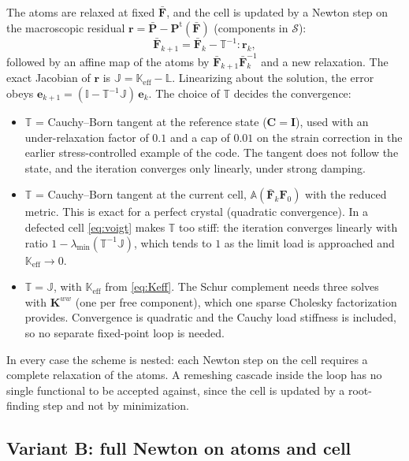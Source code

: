 \documentclass[11pt,a4paper]{article}
\newcommand{\Fb}{\bar{\mathbf F}}
\newcommand{\Pb}{\bar{\mathbf P}}
\newcommand{\Pt}{\mathbf P^{\mathrm t}}
\newcommand{\F}{\mathbf F}
\newcommand{\C}{\mathbf C}
\newcommand{\I}{\mathbf I}
\begin{document}
The atoms are relaxed at fixed \(\Fb\), and the cell is updated by a Newton step on the macroscopic
residual \(\mathbf r=\Pb-\Pt(\Fb)\) (components in \(\mathcal S\)):
\begin{equation}
  \Fb_{k+1}=\Fb_k-\mathbb T^{-1}:\mathbf r_k ,
  \label{eq:boxnewton}
\end{equation}
followed by an affine map of the atoms by \(\Fb_{k+1}\Fb_k^{-1}\) and a new relaxation. The exact
Jacobian of \(\mathbf r\) is \(\mathbb J=\mathbb K_{\mathrm{eff}}-\mathbb L\). Linearizing about the
solution, the error obeys \(\mathbf e_{k+1}=(\mathbb I-\mathbb T^{-1}\mathbb J)\,\mathbf e_k\). The choice of
\(\mathbb T\) decides the convergence:
\begin{itemize}
  \item \(\mathbb T\) = Cauchy--Born tangent at the reference state (\(\C=\I\)), used with an
    under-relaxation factor of \(0.1\) and a cap of \(0.01\) on the strain correction in the earlier
    stress-controlled example of the code. The tangent does not follow the state, and the
    iteration converges only linearly, under strong damping.
  \item \(\mathbb T\) = Cauchy--Born tangent at the current cell,
    \(\mathbb A(\Fb_k\F_0)\) with the reduced metric. This is exact for a perfect crystal
    (quadratic convergence). In a defected cell \eqref{eq:voigt} makes \(\mathbb T\) too stiff: the
    iteration converges linearly with ratio
    \(1-\lambda_{\min}(\mathbb T^{-1}\mathbb J)\), which tends to \(1\) as the limit load is
    approached and \(\mathbb K_{\mathrm{eff}}\to0\).
  \item \(\mathbb T=\mathbb J\), with \(\mathbb K_{\mathrm{eff}}\) from \eqref{eq:Keff}. The Schur
    complement needs three solves with \(\mathbf K^{ww}\) (one per free component), which one sparse
    Cholesky factorization provides. Convergence is quadratic and the Cauchy load stiffness is
    included, so no separate fixed-point loop is needed.
\end{itemize}
In every case the scheme is nested: each Newton step on the cell requires a complete relaxation of
the atoms. A remeshing cascade inside the loop has no single functional to be accepted against,
since the cell is updated by a root-finding step and not by minimization.

\subsection{Variant B: full Newton on atoms and cell}
\end{document}
